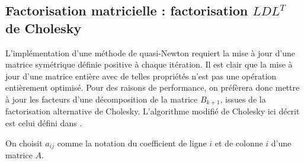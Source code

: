 \documentclass[3p, twocolumn]{elsarticle}
\begin{document}
\subsection{Factorisation matricielle : factorisation $LDL^T$ de Cholesky}
L'implémentation d'une méthode de quasi-Newton requiert la mise à jour d'une matrice symétrique définie positive à chaque itération. Il est clair que la mise à jour d'une matrice entière avec de telles propriétés n'est pas une opération entièrement optimisé. Pour des raisons de performance, on préfèrera donc mettre à jour les facteurs d'une décomposition de la matrice $B_{k+1}$, issues de la factorisation alternative de Cholesky. L'algorithme modifié de Cholesky ici décrit est celui défini dans \cite{art:McSweeney_2017}.

\begin{rmk}
    On choisit $a_{ij}$ comme la notation du coefficient de ligne $i$ et de colonne $i$ d'une matrice $A$.
\end{rmk}
\end{document}
